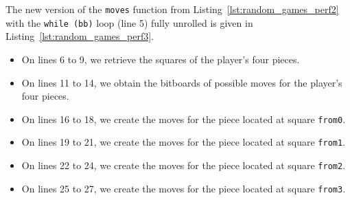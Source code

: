 \documentclass[12pt,a4paper,twoside,openright]{book}
\begin{document}
\begin{mdframed}[skipabove=0pt,skipbelow=\baselineskip,hidealllines=true,innerleftmargin=10pt,innerrightmargin=5pt,innertopmargin=3pt,innerbottommargin=3pt]
\label{lst:branch-misses-version1}
\end{mdframed}


The new version of the \texttt{moves} function from Listing~\ref{lst:random_games_perf2} with the \texttt{while (bb)} loop (line 5) fully unrolled is given in Listing~\ref{lst:random_games_perf3}.
\begin{itemize}
\item On lines 6 to 9, we retrieve the squares of the player's four pieces.
\item On lines 11 to 14, we obtain the bitboards of possible moves for the player's four pieces.
\item On lines 16 to 18, we create the moves for the piece located at square \texttt{from0}.
\item On lines 19 to 21, we create the moves for the piece located at square \texttt{from1}.
\item On lines 22 to 24, we create the moves for the piece located at square \texttt{from2}.
\item On lines 25 to 27, we create the moves for the piece located at square \texttt{from3}.
\end{itemize}
\end{document}
